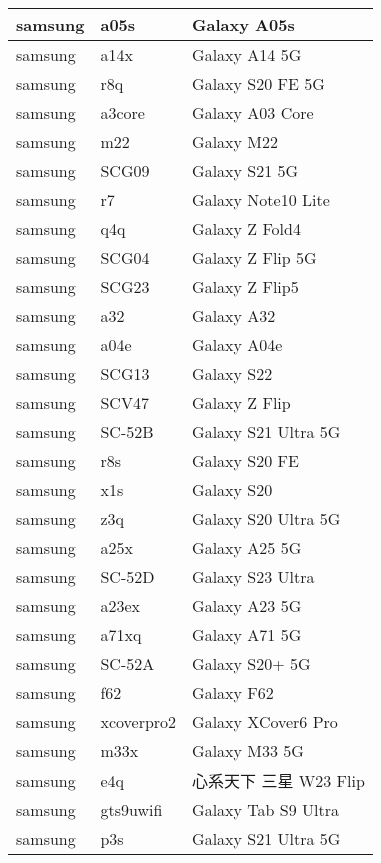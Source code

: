 \begin{tabularx}{\linewidth}{|l|X|X|}
        samsung & a05s & Galaxy A05s \\ \hline
        samsung & a14x & Galaxy A14 5G \\ \hline
        samsung & r8q & Galaxy S20 FE 5G \\ \hline
        samsung & a3core & Galaxy A03 Core \\ \hline
        samsung & m22 & Galaxy M22 \\ \hline
        samsung & SCG09 & Galaxy S21 5G \\ \hline
        samsung & r7 & Galaxy Note10 Lite \\ \hline
        samsung & q4q & Galaxy Z Fold4 \\ \hline
        samsung & SCG04 & Galaxy Z Flip 5G \\ \hline
        samsung & SCG23 & Galaxy Z Flip5 \\ \hline
        samsung & a32 & Galaxy A32 \\ \hline
        samsung & a04e & Galaxy A04e \\ \hline
        samsung & SCG13 & Galaxy S22 \\ \hline
        samsung & SCV47 & Galaxy Z Flip \\ \hline
        samsung & SC-52B & Galaxy S21 Ultra 5G \\ \hline
        samsung & r8s & Galaxy S20 FE \\ \hline
        samsung & x1s & Galaxy S20 \\ \hline
        samsung & z3q & Galaxy S20 Ultra 5G \\ \hline
        samsung & a25x & Galaxy A25 5G \\ \hline
        samsung & SC-52D & Galaxy S23 Ultra \\ \hline
        samsung & a23ex & Galaxy A23 5G \\ \hline
        samsung & a71xq & Galaxy A71 5G \\ \hline
        samsung & SC-52A & Galaxy S20+ 5G \\ \hline
        samsung & f62 & Galaxy F62 \\ \hline
        samsung & xcoverpro2 & Galaxy XCover6 Pro \\ \hline
        samsung & m33x & Galaxy M33 5G \\ \hline
        samsung & e4q & 心系天下 三星 W23 Flip \\ \hline
        samsung & gts9uwifi & Galaxy Tab S9 Ultra \\ \hline
        samsung & p3s & Galaxy S21 Ultra 5G \\ \hline

\end{tabularx}
